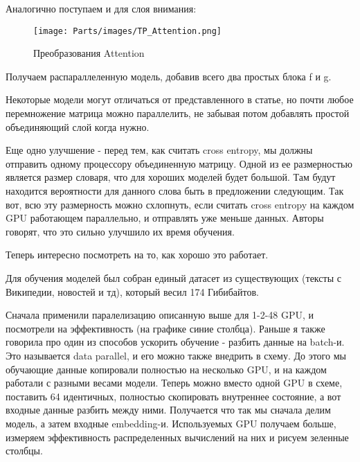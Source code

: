 Аналогично поступаем и для слоя внимания:

\begin{figure}[H]
    \centering
    \texttt{[image: Parts/images/TP\_Attention.png]}
    \caption{Преобразования Attention}
\end{figure}



Получаем распараллеленную модель, добавив всего два простых блока f и g.


Некоторые модели могут отличаться от представленного в статье, но почти любое перемножение матрица можно параллелить, не забывая потом добавлять простой объединяющий слой когда нужно. 

Еще одно  улучшение - перед тем, как считать cross entropy, мы должны отправить одному процессору объединенную матрицу. Одной из ее размерностью является размер словаря, что для хороших моделей будет большой. Там будут находится вероятности для данного слова быть в предложении следующим. Так вот, всю эту размерность можно схлопнуть, если считать  cross entropy на каждом GPU работающем параллельно, и отправлять уже меньше данных. Авторы говорят, что это сильно улучшило их время обучения. 

Теперь интересно посмотреть на то, как хорошо это работает.

Для обучения моделей был собран единый датасет из существующих (тексты с Википедии, новостей и тд), который весил 174 Гибибайтов. 

Сначала применили паралелизацию описанную выше для 1-2-48 GPU, и посмотрели на эффективность (на графике синие столбца). Раньше я также говорила про один из способов ускорить обучение - разбить данные на batch-и. Это называется data parallel, и его можно также внедрить в схему. До этого мы обучающие данные копировали полностью на несколько GPU, и на каждом работали с разными весами модели. Теперь можно вместо одной GPU в схеме, поставить 64 идентичных, полностью скопировать внутреннее состояние, а вот входные данные разбить между ними. Получается что так мы сначала делим модель, а затем входные embedding-и. Используемых GPU получаем больше, измеряем эффективность распределенных вычислений на них и рисуем зеленные столбцы.

